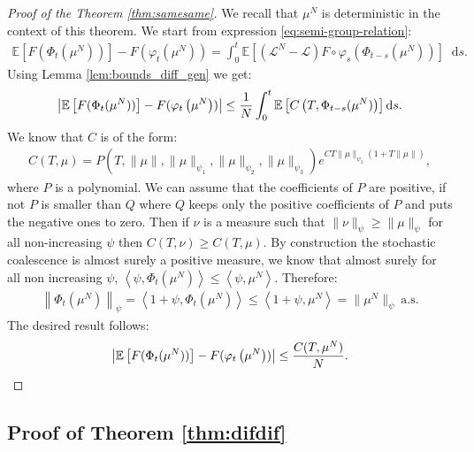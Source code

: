 \documentclass[11pt,a4paper]{article}
\newcommand{\LC}{\mathcal{L}}
\newcommand{\E}[1]{\mathbb{E}\left[#1\right]}
\newcommand{\brac}[1]{\left\langle#1\right\rangle}
\newcommand{\dd}{\mathop{}\!\mathrm{d}}
\begin{document}
\begin{proof}[Proof of the Theorem \ref{thm:samesame}]
 We recall that $\mu^N$ is deterministic in the context of this theorem. We start from expression \eqref{eq:semi-group-relation}:
 \begin{align*}
\E{F(\Phi_t(\mu^N))} - F(\varphi_t\left(\mu^N\right)) = \int_0^t \E{\left(\LC^N - \LC\right)F \circ \varphi_s (\Phi_{t-s}(\mu^N))}\dd s.
\end{align*}
Using Lemma \ref{lem:bounds_diff_gen} we get:
\begin{align*}
    \left|\vphantom{A^2} \E{F(\Phi_t(\mu^N))} - F(\varphi_t\left(\mu^N\right))\right| \leq \dfrac{1}{N} \int_0^t \E{C\left(T,\Phi_{t -s }(\mu^N)\right)} \dd s.
\end{align*}
We know that $C$ is of the form:
\begin{align*}
    C(T,\mu) = P(T,\|\mu\|,\|\mu\|_{\psi_1},\|\mu\|_{\psi_2},\|\mu\|_{\psi_3}) e^{CT\|\mu\|_{\psi_2}(1 + T\|\mu\|)},
\end{align*}
where $P$ is a polynomial. We can assume that the coefficients of $P$ are positive, if not $P$ is smaller than $Q$ where $Q$ keeps only the positive coefficients of $P$ and puts the negative ones to zero. Then if $\nu$ is a measure such that $\|\nu\|_{\psi} \geq \|\mu\|_{\psi}$ for all non-increasing $\psi$ then $C(T,\nu) \geq C(T,\mu)$. By construction the stochastic coalescence is almost surely a positive measure, we know that almost surely for all non increasing $\psi$, $\brac{\psi,\Phi_t(\mu^N)} \leq \brac{\psi,\mu^N}$. Therefore:
\begin{align*}
    \left\|\Phi_t(\mu^N) \right\|_{\psi} = \brac{1 + \psi,\Phi_t(\mu^N)} \leq \brac{1 + \psi,\mu^N} = \|\mu^N\|_{\psi}\ \text{a.s}.
\end{align*}
The desired result follows:
\begin{align*}
     \left|\vphantom{A^2} \E{F(\Phi_t(\mu^N))} - F(\varphi_t\left(\mu^N\right))\right| \leq \dfrac{C(T,\mu^N)}{N}. 
\end{align*}
\end{proof}

\subsection{Proof of Theorem \ref{thm:difdif}}
\end{document}
